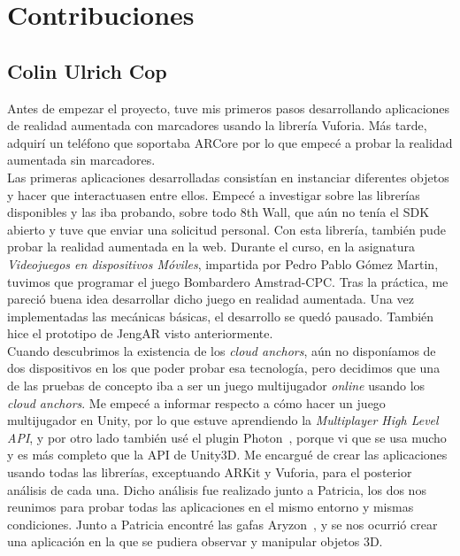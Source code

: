 \chapter{Contribuciones}

\section{Colin Ulrich Cop}

Antes de empezar el proyecto, tuve mis primeros pasos desarrollando aplicaciones de realidad aumentada con marcadores usando la librería Vuforia. Más tarde, adquirí un teléfono que soportaba ARCore por lo que empecé a probar la realidad aumentada sin marcadores.\\

Las primeras aplicaciones desarrolladas consistían en instanciar diferentes objetos y hacer que interactuasen entre ellos. Empecé a investigar sobre las librerías disponibles y las iba probando, sobre todo 8th Wall, que aún no tenía el SDK abierto y tuve que enviar una solicitud personal. Con esta librería, también pude probar la realidad aumentada en la web. Durante el curso, en la asignatura \textit{Videojuegos en dispositivos Móviles}, impartida por Pedro Pablo Gómez Martin, tuvimos que programar el juego Bombardero Amstrad-CPC. Tras la práctica, me pareció buena idea desarrollar dicho juego en realidad aumentada. Una vez implementadas las mecánicas básicas, el desarrollo se quedó pausado. También hice el prototipo de JengAR visto anteriormente.  \\

Cuando descubrimos la existencia de los \textit{cloud anchors}, aún no disponíamos de dos dispositivos en los que poder probar esa tecnología, pero decidimos que una de las pruebas de concepto iba a ser un juego multijugador \textit{online} usando los \textit{cloud anchors}. Me empecé a informar respecto a cómo hacer un juego multijugador en Unity, por lo que estuve aprendiendo la \textit{Multiplayer High Level API}, y por otro lado también usé el plugin Photon~\cite{pun}, porque vi que se usa mucho y es más completo que la API de Unity3D. Me encargué de crear las aplicaciones usando todas las librerías, exceptuando ARKit y Vuforia, para el posterior análisis de cada una. Dicho análisis fue realizado junto a Patricia, los dos nos reunimos para probar todas las aplicaciones en el mismo entorno y mismas condiciones. Junto a Patricia encontré las gafas Aryzon~\cite{Aryzon}, y se nos ocurrió crear una aplicación en la que se pudiera observar y manipular objetos 3D.\\

